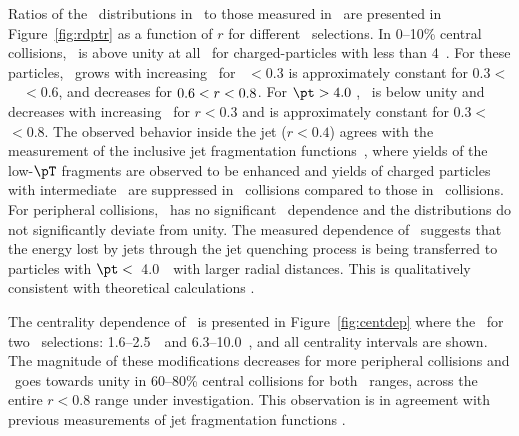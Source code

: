 Ratios of the \Dptr\ distributions in \pbpb\ to those measured in \pp\ are presented in Figure~\ref{fig:rdptr} as a function of $r$ for different \pt\ selections. In 0--10\% central collisions, 
\RDptr\ is above unity at all \rvar\ for charged-particles with \pT less than 4~\GeV.
For these particles, 
\RDptr\  grows with increasing \rvar\ for \rvar\ $ < 0.3$ is approximately constant for \mbox{$ 0.3 <$ \rvar\ $< 0.6 $}, and decreases for \mbox{$0.6 < \mbox{$r$} < 0.8$}.  For $\pt > 4.0$ \GeV, \RDptr\ is below unity and decreases with increasing \rvar\ for $r < 0.3$ and is approximately constant for \mbox{$ 0.3 <$ \rvar\ $< 0.8 $}.  The observed behavior inside the jet ($r < 0.4$) agrees with the measurement of the inclusive jet fragmentation functions~\cite{Aaboud:2017eww, PhysRevC.98.024908}, where yields of the low-$\pT$ fragments are observed to be enhanced and yields of charged particles with intermediate \pT\ are suppressed in \PbPb\ collisions compared to those in \pp\ collisions. 
For peripheral collisions, \RDptr\ has no significant \rvar\ dependence and the distributions do not significantly deviate from unity. %
The measured dependence of \RDptr\ suggests that the energy lost by jets through the jet quenching process is being transferred to particles with $\pt <$~4.0~\GeV\ with larger radial distances. This is qualitatively consistent with theoretical calculations \mbox{\cite{Qin:2015srf,Blaizot:2014ula}}.


The centrality dependence of \RDptr\ is presented in Figure~\ref{fig:centdep} where the \RDptr\ for two \pt\ selections: 1.6--2.5~\GeV\ and \mbox{6.3--10.0~\GeV}, and 
all centrality intervals are shown. The magnitude of these modifications decreases for more peripheral collisions and \RDptr\ goes towards unity in 60--80\% central collisions for both \pt\ ranges, across the entire $ r < 0.8$ range under investigation. This observation is in agreement with previous measurements of jet fragmentation functions \cite{Chatrchyan:2014ava, Sirunyan:2018jqr, Aaboud:2017bzv, PhysRevC.98.024908}.
 

